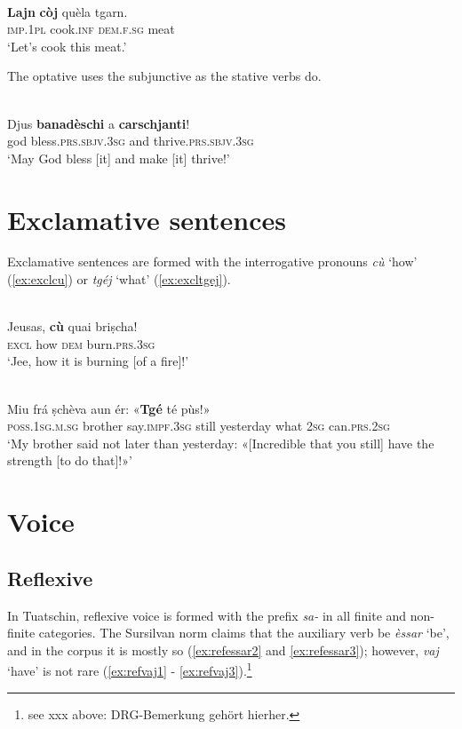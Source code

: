 \ea
\label{ex:imp.hort2}
\\
\gll \textbf{Lajn} \textbf{còj} quèla tgarn.\\
\textsc{imp.1pl} cook.\textsc{inf} \textsc{dem.f.sg} meat\\
\glt `Let's cook this meat.'
\z

The optative uses the subjunctive as the stative verbs do.

\ea
\label{}
\\
\gll Djus \textbf{banadèschi} a \textbf{carschjanti}!\\
god bless.\textsc{prs.sbjv.3sg} and thrive.\textsc{prs.sbjv.3sg}\\
\glt `May God bless [it] and make [it] thrive!'
\z


\section{Exclamative sentences}
Exclamative sentences are formed with the interrogative pronouns \textit{cù} `how' (\ref{ex:exclcu}) or \textit{tgéj} `what' (\ref{ex:excltgej}).


\ea\label{ex:exclcu}
\\
\gll Jeusas, \textbf{cù} quai briṣcha!   \\
   \textsc{excl} how \textsc{dem} burn.\textsc{prs.3sg}  \\
\glt `Jee, how it is burning [of a fire]!'
\z

\ea
\label{ex:excltgej}
\\
\gll Miu frá ṣchèva aun ér: «\textbf{Tgé} té pùs!»   \\
\textsc{poss.1sg.m.sg} brother say.\textsc{impf.3sg} still yesterday what \textsc{2sg} can.\textsc{prs.2sg} \\
\glt `My brother said not later than yesterday: «[Incredible that you still] have the strength [to do that]!»'
\z

\section{Voice}

\subsection{Reflexive}

In Tuatschin, reflexive voice is formed with the prefix \textit{sa-} in all finite and non-finite categories. The Sursilvan norm claims that the auxiliary verb be \textit{èssar} `be', and in the corpus it is mostly so (\ref{ex:refessar2} and \ref{ex:refessar3}); however, \textit{vaj} `have' is not rare (\ref{ex:refvaj1} - \ref{ex:refvaj3}).\footnote{see xxx above: DRG-Bemerkung gehört hierher.}

